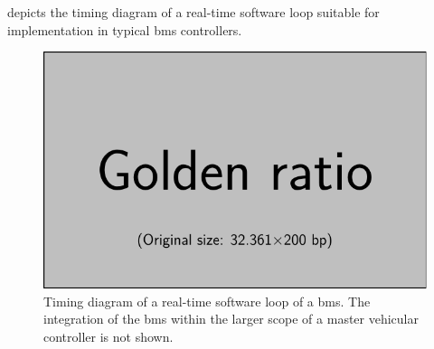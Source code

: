  depicts  the timing diagram of  a real-time software
loop suitable for implementation in typical \gls{bms} controllers.

\begin{figure}[h]
    \centering
    \includegraphics[width=\textwidth]{placeholder_images/example-image-golden.pdf}
    \caption[Timing diagram of a real-time software loop of a \gls{bms}]
    {Timing diagram of a real-time software loop of a \gls{bms}. The integration  of the  \gls{bms} within  the larger  scope of  a master  vehicular controller is not shown.}
    \label{fig:timingdiagramBig}
\end{figure}









